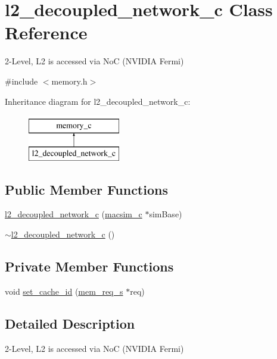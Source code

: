 \hypertarget{classl2__decoupled__network__c}{
\section{l2\_\-decoupled\_\-network\_\-c Class Reference}
\label{classl2__decoupled__network__c}
}


2-\/Level, L2 is accessed via NoC (NVIDIA Fermi)  




{\ttfamily \#include $<$memory.h$>$}

Inheritance diagram for l2\_\-decoupled\_\-network\_\-c:\begin{figure}[H]
\begin{center}
\leavevmode
\includegraphics[height=2.000000cm]{classl2__decoupled__network__c}
\end{center}
\end{figure}
\subsection*{Public Member Functions}
\begin{DoxyCompactItemize}
\item 
\hyperlink{classl2__decoupled__network__c_a702ce99305d9252cc41167a69ac5e54b}{l2\_\-decoupled\_\-network\_\-c} (\hyperlink{classmacsim__c}{macsim\_\-c} $\ast$simBase)
\item 
\hyperlink{classl2__decoupled__network__c_a2fc1a52406c46fee438c755912ae2878}{$\sim$l2\_\-decoupled\_\-network\_\-c} ()
\end{DoxyCompactItemize}
\subsection*{Private Member Functions}
\begin{DoxyCompactItemize}
\item 
void \hyperlink{classl2__decoupled__network__c_aea63c8492607041d4d3ab90c8fa2961e}{set\_\-cache\_\-id} (\hyperlink{structmem__req__s}{mem\_\-req\_\-s} $\ast$req)
\end{DoxyCompactItemize}


\subsection{Detailed Description}
2-\/Level, L2 is accessed via NoC (NVIDIA Fermi) 

